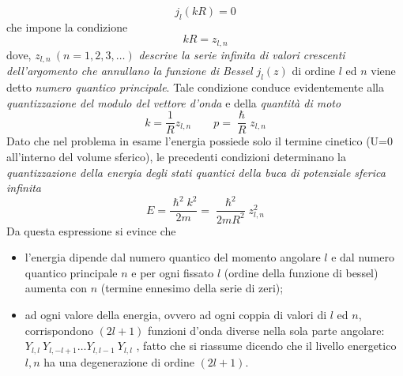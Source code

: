 \[
j_{l}(kR) = 0
\]
che impone la condizione
\[
kR = z_{l,n}
\]
dove, $z_{l,n} \ (n= 1,2,3,\dots)$ \emph{descrive la serie infinita di valori crescenti dell’argomento che annullano la funzione di Bessel} $j_{l}(z)$ di ordine $l$ ed $n$ viene detto \emph{numero quantico principale}. Tale condizione conduce evidentemente alla \emph{quantizzazione del modulo del vettore d’onda} e della \emph{quantità di moto}
\[
k = \frac{1}{R} z_{l,n} \qquad p = \frac{\hslash}{R}z_{l,n}
\]
Dato che nel problema in esame l’energia possiede solo il termine cinetico (U=0 all’interno del volume sferico), le precedenti condizioni determinano la \emph{quantizzazione della energia degli stati quantici della buca di potenziale sferica infinita}
\begin{equation}
	E = \frac{\hslash^{2}k^{2}}{2m} = \frac{\hslash^{2}}{2mR^{2}}z_{l,n}^{2}
	\label{eq:energy-levels-infinite-spherical-potential-well}
\end{equation}
Da questa espressione si evince che
\begin{itemize}
	\item l’energia dipende dal numero quantico del momento angolare $l$ e dal numero quantico principale  $n$ e per ogni fissato $l$ (ordine della funzione di bessel) aumenta con $n$ (termine ennesimo della serie di zeri);
	\item ad ogni valore della energia, ovvero ad ogni coppia di valori di $l$ ed $n$, corrispondono $(2l+1)$ funzioni d’onda
	diverse nella sola parte angolare: $Y_{l,l} \  Y_{l, -l+1} \dots Y_{l,l-1} \ Y_{l,l}$ , fatto che si riassume dicendo
	che il livello energetico $l, n$ ha una degenerazione di ordine $(2l+1)$.
\end{itemize}
